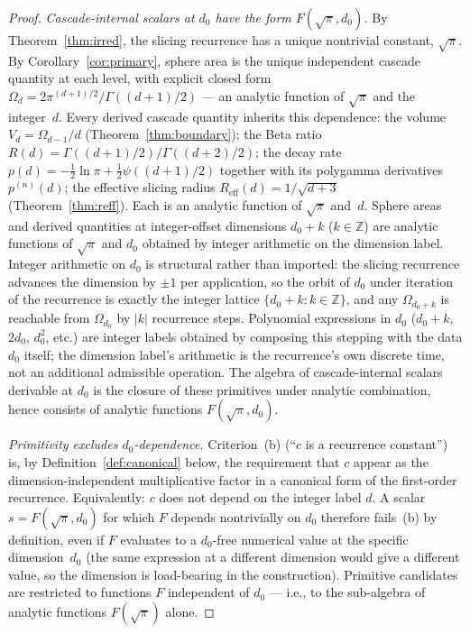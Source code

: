\documentclass[11pt,a4paper]{article}
\begin{document}
\begin{proof}
\emph{Cascade-internal scalars at $d_0$ have the form $F(\sqrt{\pi}, d_0)$.}
By Theorem~\ref{thm:irred}, the slicing recurrence has a unique
nontrivial constant, $\sqrt{\pi}$. By Corollary~\ref{cor:primary}, sphere
area is the unique independent cascade quantity at each level, with
explicit closed form $\Omega_d = 2\pi^{(d+1)/2}/\Gamma((d+1)/2)$ --- an
analytic function of $\sqrt{\pi}$ and the integer~$d$. Every derived
cascade quantity inherits this dependence:
the volume $V_d = \Omega_{d-1}/d$ (Theorem~\ref{thm:boundary});
the Beta ratio $R(d) = \Gamma((d+1)/2)/\Gamma((d+2)/2)$;
the decay rate $p(d) = -\tfrac{1}{2}\ln\pi + \tfrac{1}{2}\psi((d+1)/2)$
together with its polygamma derivatives $p^{(n)}(d)$;
the effective slicing radius $R_{\mathrm{eff}}(d) = 1/\sqrt{d+3}$
(Theorem~\ref{thm:reff}). Each is an analytic function of $\sqrt{\pi}$
and~$d$. Sphere areas and derived quantities at integer-offset
dimensions $d_0 + k$ ($k\in\mathbb{Z}$) are analytic functions of
$\sqrt{\pi}$ and $d_0$ obtained by integer arithmetic on the dimension
label. Integer arithmetic on $d_0$ is structural rather than imported:
the slicing recurrence advances the dimension by $\pm 1$ per
application, so the orbit of $d_0$ under iteration of the recurrence
is exactly the integer lattice $\{d_0 + k : k\in\mathbb{Z}\}$, and any
$\Omega_{d_0+k}$ is reachable from $\Omega_{d_0}$ by $|k|$ recurrence
steps. Polynomial expressions in $d_0$ ($d_0+k$, $2d_0$, $d_0^2$,
etc.) are integer labels obtained by composing this stepping with the
data $d_0$ itself; the dimension label's arithmetic is the
recurrence's own discrete time, not an additional admissible
operation. The algebra of cascade-internal scalars derivable at $d_0$
is the closure of these primitives under analytic combination, hence
consists of analytic functions $F(\sqrt{\pi}, d_0)$.

\emph{Primitivity excludes $d_0$-dependence.} Criterion~(b) (``$c$ is a
recurrence constant'') is, by Definition~\ref{def:canonical} below,
the requirement that $c$ appear as the dimension-independent
multiplicative factor in a canonical form of the first-order
recurrence. Equivalently: $c$ does not depend on the integer label
$d$. A scalar $s = F(\sqrt{\pi}, d_0)$ for which $F$ depends nontrivially
on $d_0$ therefore fails~(b) by definition, even if $F$ evaluates to a
$d_0$-free numerical value at the specific dimension~$d_0$ (the same
expression at a different dimension would give a different value, so
the dimension is load-bearing in the construction). Primitive
candidates are restricted to functions $F$ independent of $d_0$ ---
i.e., to the sub-algebra of analytic functions $F(\sqrt{\pi})$ alone.


\end{proof}
\end{document}
